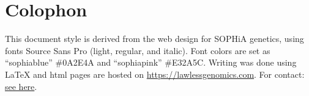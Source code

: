 \documentclass{article}
\begin{document}
\section{Colophon}
This document style is derived from the web design for SOPHiA genetics, using fonts  Source Sans Pro (light, regular, and italic).
Font colors are set as ``sophiablue'' \#0A2E4A and  ``sophiapink'' \#E32A5C.
Writing was done using LaTeX and html pages are hosted on 
\href{https://lawlessgenomics.com}{https://lawlessgenomics.com}.
For contact:  \href{https://lawlessgenomics.com/resume/pdf/Dylan_Lawless.pdf}{see here}.


\end{document}
